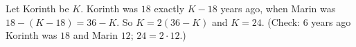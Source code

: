 Let Korinth be $K$. Korinth was $18$ exactly $K-18$ years ago, when Marin was $18-(K-18)=36-K$. So $K=2(36-K)$ and $K=\boxed{24}$. (Check: $6$ years ago Korinth was $18$ and Marin $12$; $24=2\cdot12$.)
